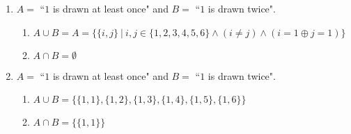 \documentclass[11pt]{article}
\begin{document}
\begin{enumerate}
\begin{enumerate}
\begin {enumerate}
\end {enumerate}

\item $A =$ ``$1$ is drawn at least once" and $B = $ ``$1$ is drawn twice".


\begin {enumerate}

\item $A\cup B = A = \{\{i,j\} \: | \: i,j \in \{1,2,3,4,5,6\} \land (i \neq j) \land (i = 1 \oplus j = 1) \} $
\item $A \cap B = \emptyset $

\end {enumerate}

\item $A =$ ``$1$ is drawn at least once" and $B = $ ``$1$ is drawn twice".



\begin {enumerate}

\item $A \cup B = \{\{1,1\},\{1,2\},\{1,3\},\{1,4\},\{1,5\},\{1,6\}\}$ 
\item $A \cap B = \{\{1,1\}\} $

\end {enumerate}

\end{enumerate}

\end{enumerate}










\begin{appendix}
\end{appendix}
\end{document}
